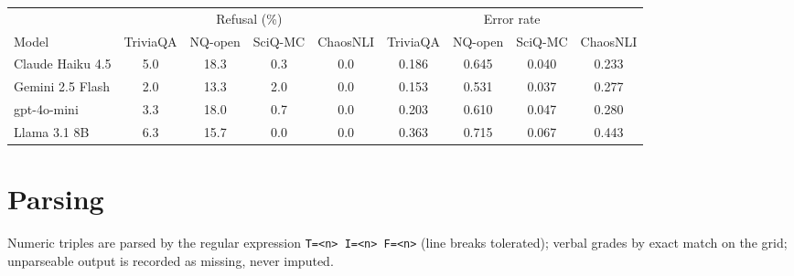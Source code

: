 \documentclass[11pt]{article}
\begin{document}
\begin{table}[h]
\centering
\small
\begin{tabular}{lcccccccc}
\toprule
 & \multicolumn{4}{c}{Refusal (\%)} & \multicolumn{4}{c}{Error rate} \\
\cmidrule(lr){2-5}\cmidrule(lr){6-9}
Model & TriviaQA & NQ-open & SciQ-MC & ChaosNLI & TriviaQA & NQ-open & SciQ-MC & ChaosNLI \\
\midrule
Claude Haiku 4.5 & 5.0 & 18.3 & 0.3 & 0.0 & 0.186 & 0.645 & 0.040 & 0.233 \\
Gemini 2.5 Flash & 2.0 & 13.3 & 2.0 & 0.0 & 0.153 & 0.531 & 0.037 & 0.277 \\
gpt-4o-mini      & 3.3 & 18.0 & 0.7 & 0.0 & 0.203 & 0.610 & 0.047 & 0.280 \\
Llama 3.1 8B     & 6.3 & 15.7 & 0.0 & 0.0 & 0.363 & 0.715 & 0.067 & 0.443 \\
\bottomrule
\end{tabular}
\end{table}

\section{Parsing}
Numeric triples are parsed by the regular expression
\texttt{T=<n> I=<n> F=<n>} (line breaks tolerated); verbal grades by exact match on the grid;
unparseable output is recorded as missing, never imputed.



\end{document}
